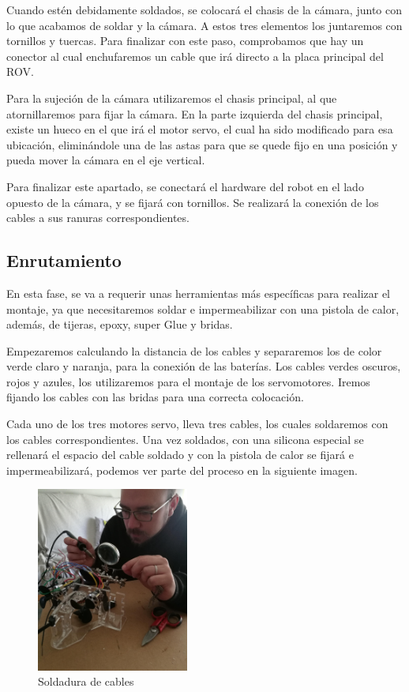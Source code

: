 Cuando estén debidamente soldados, se colocará el chasis de la cámara, junto con lo que acabamos de soldar y la cámara. A estos tres elementos los juntaremos con tornillos y tuercas. Para finalizar con este paso, comprobamos que hay un conector al cual enchufaremos un cable que irá directo a la placa principal del ROV.

Para la sujeción de la cámara utilizaremos el chasis principal, al que atornillaremos para fijar la cámara. En la parte izquierda del chasis principal, existe un hueco en el que irá el motor servo, el cual ha sido modificado para esa ubicación, eliminándole una de las astas para que se quede fijo en una posición y pueda mover la cámara en el eje vertical.

Para finalizar este apartado, se conectará el hardware del robot en el lado opuesto de la cámara, y se fijará con tornillos. Se realizará la conexión de los cables a sus ranuras correspondientes.

\subsection{Enrutamiento}
\label{subsec:enrutamiento}

En esta fase, se va a requerir unas herramientas más específicas para realizar el montaje, ya que necesitaremos soldar e impermeabilizar con una pistola de calor, además, de tijeras, epoxy, super Glue y bridas.

Empezaremos calculando la distancia de los cables y separaremos los de color verde claro y naranja, para la conexión de las baterías. Los cables verdes oscuros, rojos y azules, los utilizaremos para el montaje de los servomotores. Iremos fijando los cables con las bridas para una correcta colocación.

Cada uno de los tres motores servo, lleva tres cables, los cuales soldaremos con los cables correspondientes. Una vez soldados, con una silicona especial se rellenará el espacio del cable soldado y con la pistola de calor se fijará e impermeabilizará, podemos ver parte del proceso en la siguiente imagen.


\begin{figure} [hbtp]
  \begin{center}
    \includegraphics[width=5cm]{img/cap3/3_3/soldar}
  \end{center}
  \caption{Soldadura de cables}
  \label{fig:soldar}
\end{figure}

